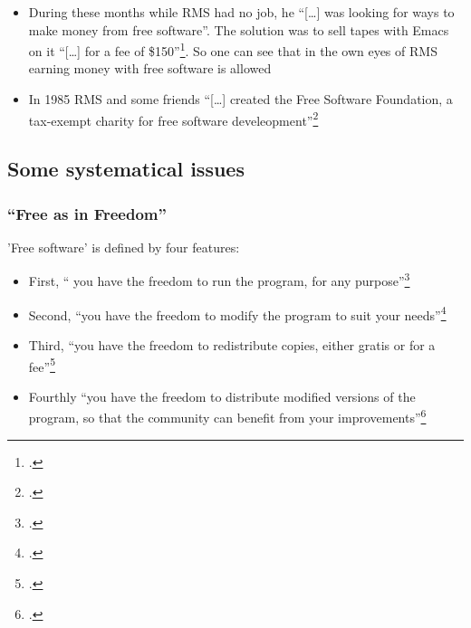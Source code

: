 \documentclass[DIV=calc,BCOR=5mm,11pt,headings=small,oneside,abstract=true, toc=bib]{scrartcl}
\begin{document}
\begin{itemize}
{  software}\footcite[cf][18]{Stallman1999a}. To give up the job was
  essential for RMS because he did not want to allow the MIT to cover his
  work\footcite[cf][18]{Stallman1999a}. But nevertheless he was supported by the
  MIT: they \enquote{[\ldots] kindly invited (him) to keep using the lab’s
  facilities}\footcite[cf][19]{Stallman1999a}:
  \begin{itemize}
    \item First, RMS evaluated wether he could reuse any existing compiler.
    Later on he had to write hiw own compiler, the
    GCC\footcite[cf][19]{Stallman1999a}
    \item From Sepmtember 1984 on he wrote the GNU emacs
    editor\footcite[cf][19]{Stallman1999a}
  \end{itemize}
  \item During these months while RMS had no job, he \enquote{[\ldots] was looking
  for ways to make money from free software}. The solution was to sell
  tapes with Emacs on it \enquote{[\ldots] for a fee of
  \$150}\footcite[cf][19f]{Stallman1999a}. So one can see that in the own
  eyes of RMS earning money with free software is allowed
  \item In 1985 RMS and some friends \enquote{[\ldots] created the Free Software
  Foundation, a tax-exempt charity for free software
  develeopment}\footcite[cf][21]{Stallman1999a}
\end{itemize}


\subsection{Some systematical issues}
\subsubsection{\enquote{Free as in Freedom}}
’Free software’ is defined by four features:
\begin{itemize}
  \item First, \enquote{ you have the freedom to run the program, for any
  purpose}\footcite[cf][18]{Stallman1999a}
  \item Second, \enquote{you have the freedom to modify the program to suit your
  needs}\footcite[cf][18]{Stallman1999a}
  \item Third, \enquote{you have the freedom to redistribute copies, either
  gratis or for a fee}\footcite[cf][18]{Stallman1999a}
  \item Fourthly \enquote{you have the freedom to distribute modified versions of
  the program, so that the community can benefit from your
  improvements}\footcite[cf][18]{Stallman1999a}
\end{itemize}
\end{document}
